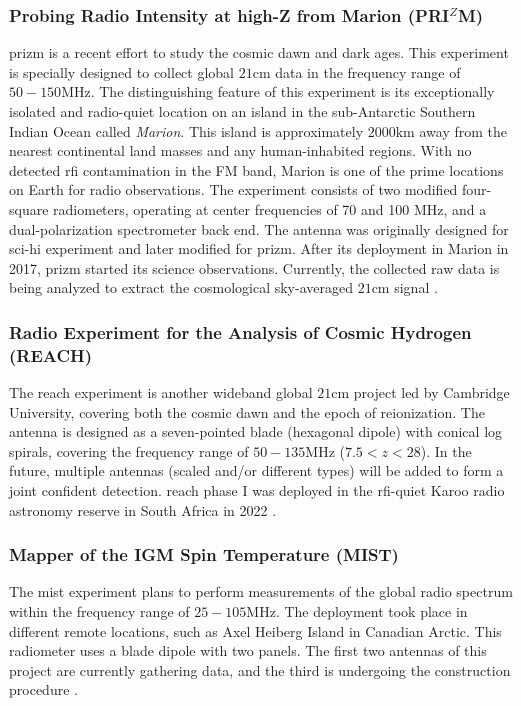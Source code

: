 \documentclass[12pt, TexShade, letterpaper]{report}
\begin{document}
\subsubsection{Probing Radio Intensity at high-Z from Marion (PRI$^Z$M)}
\gls{prizm} is a recent effort to study the cosmic dawn and dark ages. This experiment is specially designed to collect global $\mathrm{21cm}$ data in the frequency range of $\mathrm{50-150MHz}$. The distinguishing feature of this experiment is its exceptionally isolated and radio-quiet location on an island in the sub-Antarctic Southern Indian Ocean called \emph{Marion}. This island is approximately $\mathrm{2000km}$ away from the nearest continental land masses and any human-inhabited regions. With no detected \gls{rfi} contamination in the FM band, Marion is one of the prime locations on Earth for radio observations. The experiment consists of two modified four-square radiometers, operating at center frequencies of 70 and 100 $\mathrm{MHz}$, and a dual-polarization spectrometer back end. The antenna was originally designed for \gls{sci-hi} experiment \cite{sci-hi_1, sci-hi_2} and later modified for \gls{prizm}. After its deployment in Marion in 2017, \gls{prizm} started its science observations. Currently, the collected raw data is being analyzed to extract the cosmological sky-averaged $\mathrm{21cm}$ signal \cite{prizm_2017, prizm_thesis}.\par 

\subsubsection{Radio Experiment for the Analysis of Cosmic Hydrogen (REACH)}
The \gls{reach} experiment is another wideband global $\mathrm{21cm}$ project led by Cambridge University, covering both the cosmic dawn and the epoch of reionization. The antenna is designed as a seven-pointed blade (hexagonal dipole) with conical log spirals, covering the frequency range of $50-135\mathrm{MHz}$ ($7.5 < z < 28$). In the future, multiple antennas (scaled and/or different types) will be added to form a joint confident detection. \gls{reach} phase I was deployed in the \gls{rfi}-quiet Karoo radio astronomy reserve in South Africa in 2022 \cite{reach_z, reach, reach_design}. \par

\subsubsection{Mapper of the IGM Spin Temperature (MIST)}
The \gls{mist} experiment plans to perform measurements of the global radio spectrum within the frequency range of $25-105 \mathrm{MHz}$. The deployment took place in different remote locations, such as Axel Heiberg Island in Canadian Arctic. This radiometer uses a blade dipole with two panels. The first two antennas of this project are currently gathering data, and the third is undergoing the construction procedure \cite{mist, mist_presentation, mist_website}.
\end{document}
